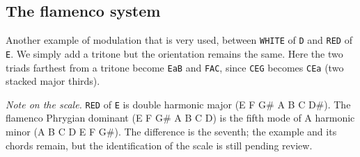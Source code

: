 \documentclass[]{report}
\begin{document}
\subsection{The flamenco system}
Another example of modulation that is very used, between \texttt{WHITE} of \texttt{D} and \texttt{RED} of \texttt{E}. We simply add a tritone but the orientation remains the same. Here the two triads farthest from a tritone become \texttt{EaB} and \texttt{FAC}, since \texttt{CEG} becomes \texttt{CEa} (two stacked major thirds).

\emph{Note on the scale.} \texttt{RED} of \texttt{E} is double harmonic major
(E F G\# A B C D\#). The flamenco Phrygian dominant (E F G\# A B C D) is the
fifth mode of A harmonic minor (A B C D E F G\#). The difference is the
seventh; the example and its chords remain, but the identification of the scale
is still pending review.
\end{document}
